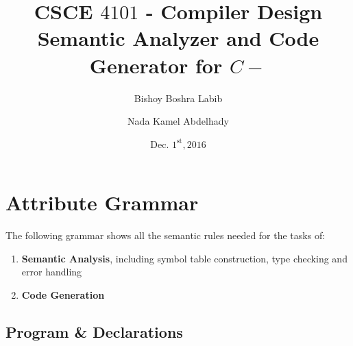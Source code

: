 \documentclass[12pt]{article}
\author{Bishoy Boshra Labib\and Nada Kamel Abdelhady}
\date{Dec. $1^\text{st}, 2016$}
\title{CSCE $4101$ - Compiler Design\\Semantic Analyzer and Code Generator for $C-$}
\begin{document}
\maketitle
\tableofcontents
\clearpage
\section{Attribute Grammar}
The following grammar shows all the semantic rules needed for the tasks of:
\begin{enumerate}[label = \Roman*.]
\item \textbf{Semantic Analysis}, including symbol table construction, type checking and error handling
\item \textbf{Code Generation}
\end{enumerate}

\subsection{Program \& Declarations}
\end{document}
